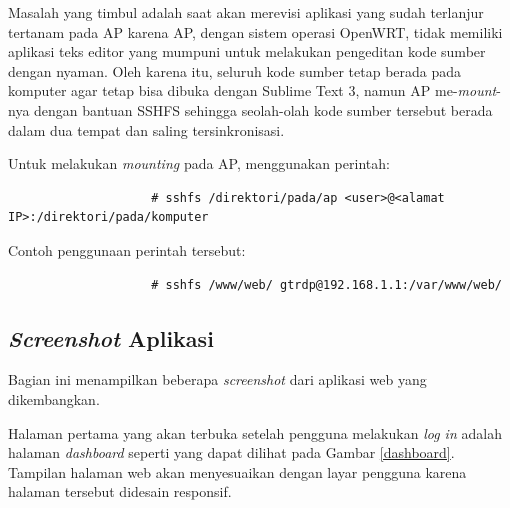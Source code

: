 			Masalah yang timbul adalah saat akan merevisi aplikasi yang sudah terlanjur tertanam pada AP karena AP, dengan sistem operasi OpenWRT, tidak memiliki aplikasi teks editor yang mumpuni untuk melakukan pengeditan kode sumber dengan nyaman. Oleh karena itu, seluruh kode sumber tetap berada pada komputer agar tetap bisa dibuka dengan Sublime Text 3, namun AP me-\emph{mount}-nya dengan bantuan SSHFS sehingga seolah-olah kode sumber tersebut berada dalam dua tempat dan saling tersinkronisasi.

			Untuk melakukan \emph{mounting} pada AP, menggunakan perintah:
			\begingroup
			    \fontsize{10pt}{12pt}\selectfont
			    \begin{verbatim}
					# sshfs /direktori/pada/ap <user>@<alamat IP>:/direktori/pada/komputer
			    \end{verbatim}  
			\endgroup

			Contoh penggunaan perintah tersebut:
			\begingroup
			    \fontsize{10pt}{12pt}\selectfont
			    \begin{verbatim}
					# sshfs /www/web/ gtrdp@192.168.1.1:/var/www/web/
			    \end{verbatim}  
			\endgroup
			

		\subsection{\emph{Screenshot} Aplikasi}
			Bagian ini menampilkan beberapa \emph{screenshot} dari aplikasi web yang dikembangkan.

			Halaman pertama yang akan terbuka setelah pengguna melakukan \emph{log in} adalah halaman \emph{dashboard} seperti yang dapat dilihat pada Gambar \ref{dashboard}. Tampilan halaman web akan menyesuaikan dengan layar pengguna karena halaman tersebut didesain responsif.

